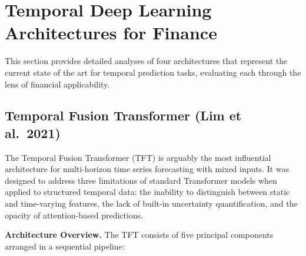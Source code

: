 \documentclass[conference]{IEEEtran}
\begin{document}
\section{Temporal Deep Learning Architectures for Finance}
\label{sec:temporal}

This section provides detailed analyses of four architectures that represent the current state of the art for temporal prediction tasks, evaluating each through the lens of financial applicability.

\subsection{Temporal Fusion Transformer (Lim et al.\ 2021)}

The Temporal Fusion Transformer (TFT) \cite{lim2021temporal} is arguably the most influential architecture for multi-horizon time series forecasting with mixed inputs. It was designed to address three limitations of standard Transformer models when applied to structured temporal data: the inability to distinguish between static and time-varying features, the lack of built-in uncertainty quantification, and the opacity of attention-based predictions.

\textbf{Architecture Overview.} The TFT consists of five principal components arranged in a sequential pipeline:
\end{document}
